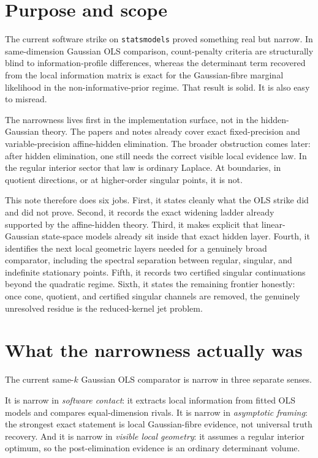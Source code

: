 \documentclass[11pt,a4paper]{article}
\numberwithin{equation}{section}
\theoremstyle{thmcompact}
\theoremstyle{remark}
\begin{document}
\section{Purpose and scope}

The current software strike on \texttt{statsmodels} proved something real but narrow. In same-dimension Gaussian OLS comparison, count-penalty criteria are structurally blind to information-profile differences, whereas the determinant term recovered from the local information matrix is exact for the Gaussian-fibre marginal likelihood in the non-informative-prior regime. That result is solid. It is also easy to misread.

The narrowness lives first in the implementation surface, not in the hidden-Gaussian theory. The papers and notes already cover exact fixed-precision and variable-precision affine-hidden elimination. The broader obstruction comes later: after hidden elimination, one still needs the correct visible local evidence law. In the regular interior sector that law is ordinary Laplace. At boundaries, in quotient directions, or at higher-order singular points, it is not.

This note therefore does six jobs. First, it states cleanly what the OLS strike did and did not prove. Second, it records the exact widening ladder already supported by the affine-hidden theory. Third, it makes explicit that linear-Gaussian state-space models already sit inside that exact hidden layer. Fourth, it identifies the next local geometric layers needed for a genuinely broad comparator, including the spectral separation between regular, singular, and indefinite stationary points. Fifth, it records two certified singular continuations beyond the quadratic regime. Sixth, it states the remaining frontier honestly: once cone, quotient, and certified singular channels are removed, the genuinely unresolved residue is the reduced-kernel jet problem.

\section{What the narrowness actually was}

The current same-$k$ Gaussian OLS comparator is narrow in three separate senses.

It is narrow in \emph{software contact}: it extracts local information from fitted OLS models and compares equal-dimension rivals. It is narrow in \emph{asymptotic framing}: the strongest exact statement is local Gaussian-fibre evidence, not universal truth recovery. And it is narrow in \emph{visible local geometry}: it assumes a regular interior optimum, so the post-elimination evidence is an ordinary determinant volume.
\end{document}
